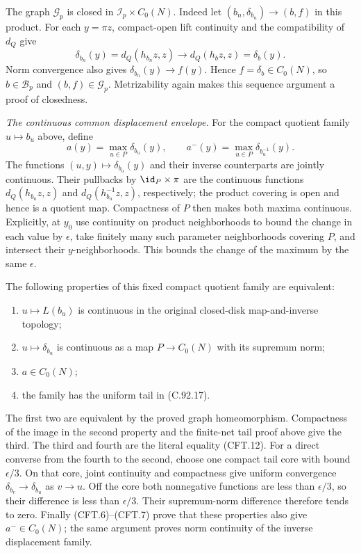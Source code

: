 The graph $\mathscr G_p$ is closed in
$\mathscr I_p\times C_0(N)$. Indeed let
$(b_n,\delta_{b_n})\to(b,f)$ in this product. For each
$y=\pi z$, compact-open lift continuity and the compatibility
of $d_Q$ give
\[
  \delta_{b_n}(y)=d_Q(h_{b_n}z,z)
                \longrightarrow d_Q(h_bz,z)=\delta_b(y).
                                                               \tag{CFT.11}
\]
Norm convergence also gives $\delta_{b_n}(y)\to f(y)$.
Hence $f=\delta_b\in C_0(N)$, so $b\in\mathscr B_p$ and
$(b,f)\in\mathscr G_p$. Metrizability again makes this
sequence argument a proof of closedness.

\emph{The continuous common displacement envelope.}
For the compact quotient family $u\mapsto b_u$ above, define
\[
 a(y)=\max_{u\in P}\delta_{b_u}(y),\qquad
 a^-(y)=\max_{u\in P}\delta_{b_u^{-1}}(y).
                                                               \tag{CFT.12}
\]
The functions $(u,y)\mapsto\delta_{b_u}(y)$ and their inverse
counterparts are jointly continuous. Their pullbacks by
$\id_P\times\pi$ are the continuous functions
$d_Q(h_{b_u}z,z)$ and $d_Q(h_{b_u}^{-1}z,z)$, respectively;
the product covering is open and hence is a quotient map.
Compactness of $P$ then makes both maxima continuous.
Explicitly, at $y_0$ use continuity on product neighborhoods
to bound the change in each value by $\epsilon$, take finitely
many such parameter neighborhoods covering $P$, and intersect
their $y$-neighborhoods. This bounds the change of the maximum
by the same $\epsilon$.

The following properties of this fixed compact quotient
family are equivalent:
\begin{enumerate}
\item $u\mapsto L(b_u)$ is continuous in the original
      closed-disk map-and-inverse topology;
\item $u\mapsto\delta_{b_u}$ is continuous as a map
      $P\to C_0(N)$ with its supremum norm;
\item $a\in C_0(N)$;
\item the family has the uniform tail in (C.92.17).
\end{enumerate}
The first two are equivalent by the proved graph
homeomorphism. Compactness of the image in the second
property and the finite-net tail proof above give the third.
The third and fourth are the literal equality (CFT.12).
For a direct converse from the fourth to the second, choose
one compact tail core with bound $\epsilon/3$. On that core,
joint continuity and compactness give uniform convergence
$\delta_{b_v}\to\delta_{b_u}$ as $v\to u$. Off the core both
nonnegative functions are less than $\epsilon/3$, so their
difference is less than $\epsilon/3$. Their supremum-norm
difference therefore tends to zero. Finally (CFT.6)--(CFT.7)
prove that these properties also give $a^-\in C_0(N)$;
the same argument proves norm continuity of the inverse
displacement family.


